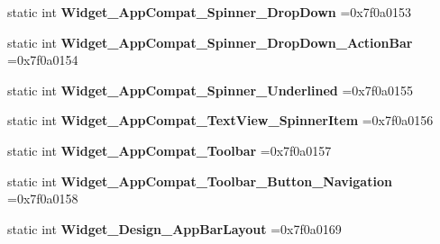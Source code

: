 \begin{DoxyCompactItemize}
\mbox{\label{classandroid_1_1support_1_1v7_1_1recyclerview_1_1R_1_1style_ab70f28016b91e25fac4dceb9584c38d5}} 
static int {\bfseries Widget\+\_\+\+App\+Compat\+\_\+\+Spinner\+\_\+\+Drop\+Down} =0x7f0a0153
\item 
\mbox{\label{classandroid_1_1support_1_1v7_1_1recyclerview_1_1R_1_1style_a8c039781ae2393c3d737f0c189e316ca}} 
static int {\bfseries Widget\+\_\+\+App\+Compat\+\_\+\+Spinner\+\_\+\+Drop\+Down\+\_\+\+Action\+Bar} =0x7f0a0154
\item 
\mbox{\label{classandroid_1_1support_1_1v7_1_1recyclerview_1_1R_1_1style_a8c3e10010193020b2312cccf9c323bad}} 
static int {\bfseries Widget\+\_\+\+App\+Compat\+\_\+\+Spinner\+\_\+\+Underlined} =0x7f0a0155
\item 
\mbox{\label{classandroid_1_1support_1_1v7_1_1recyclerview_1_1R_1_1style_a0f5172041dafbe36d9e9e7293e76ee9f}} 
static int {\bfseries Widget\+\_\+\+App\+Compat\+\_\+\+Text\+View\+\_\+\+Spinner\+Item} =0x7f0a0156
\item 
\mbox{\label{classandroid_1_1support_1_1v7_1_1recyclerview_1_1R_1_1style_a7eca756385a414fb12ffbb980fe441f5}} 
static int {\bfseries Widget\+\_\+\+App\+Compat\+\_\+\+Toolbar} =0x7f0a0157
\item 
\mbox{\label{classandroid_1_1support_1_1v7_1_1recyclerview_1_1R_1_1style_ad333e710f54dedf0da8e9a3ae98bb988}} 
static int {\bfseries Widget\+\_\+\+App\+Compat\+\_\+\+Toolbar\+\_\+\+Button\+\_\+\+Navigation} =0x7f0a0158
\item 
\mbox{\label{classandroid_1_1support_1_1v7_1_1recyclerview_1_1R_1_1style_a32b1db775bf72d9d501be13314142c7b}} 
static int {\bfseries Widget\+\_\+\+Design\+\_\+\+App\+Bar\+Layout} =0x7f0a0169
\item 
\mbox{\label{classandroid_1_1support_1_1v7_1_1recyclerview_1_1R_1_1style_ad3f6b254e8c10afa9adb9eff7c83c2f4}} 

\end{DoxyCompactItemize}
